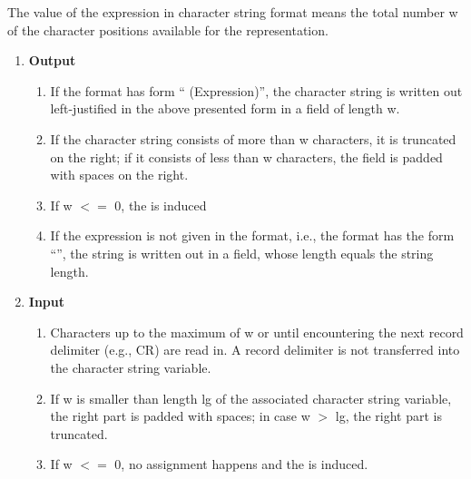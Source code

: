 
The value of the expression in character string format means the total
number w of the character positions available for the representation.
\begin{enumerate}
\item {\bf Output}\\
\begin{enumerate}
\item If the format has form `` (Expression)'', the character string is
written out left-justified in the above presented form in a field of
length w.
\item  If the character string consists of more than w characters, it
is truncated on the right; if it consists of less than w characters, the
field is padded with spaces on the right. 
\item If w $<=$ 0, the  is induced
\item If the expression is not given in the format, i.e., the format has the
form ``'', the string is written out in a field, whose length equals
the string length.
\end{enumerate}
\item {\bf Input}\\
\begin{enumerate}
\item Characters up to the maximum of w or until encountering the next record
delimiter (e.g., CR) are read in. A record delimiter is not transferred
into the character string variable.
\item If w is smaller than length lg of the associated character string
variable, the right part is padded with spaces; in case w $>$ lg, the
right part is truncated.
\item  If w $<=$ 0, no assignment happens and the  is 
   induced. 
\end{enumerate}
\end{enumerate}

